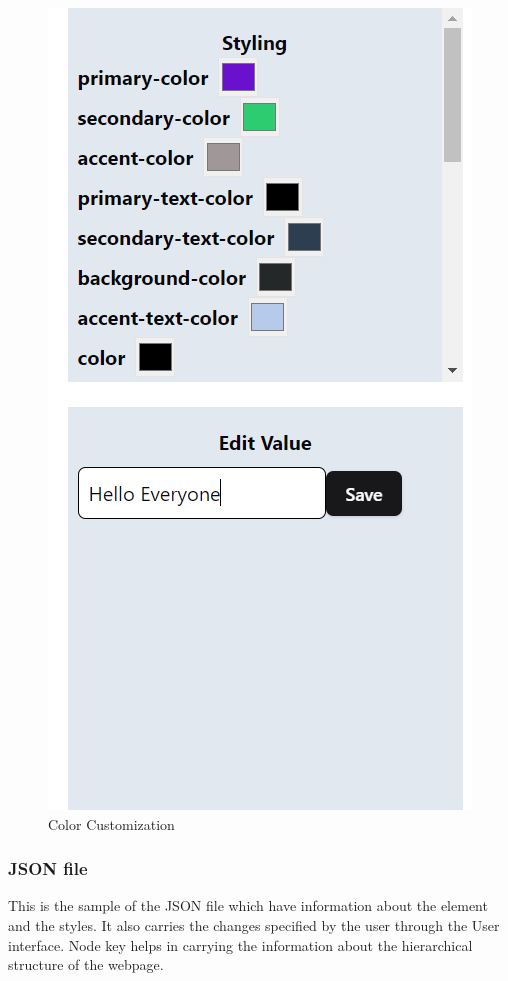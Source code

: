 \begin{figure}[H]
\begin{minipage}{0.5\textwidth}
        \includegraphics[width=\linewidth, trim=0 250 0 0, clip]{images/customization 2.png}
        \caption{Color Customization}
        \label{fig:c2}
    \end{minipage}
\end{figure}


\subsubsection{JSON file}
This is the sample of the JSON file which have information about the element and the styles. It also carries the changes 
specified by the user through the User interface. Node key helps in carrying the information about the hierarchical structure of the webpage.
 
